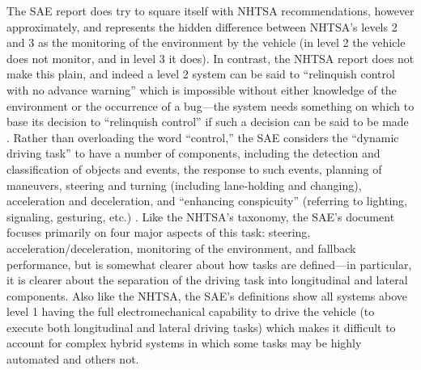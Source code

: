 The SAE report does try to square itself with NHTSA recommendations,
however approximately, and represents the hidden difference between
NHTSA's levels 2 and 3 as the monitoring of the environment by the
vehicle (in level 2 the vehicle does not monitor, and in level 3 it
does). In contrast, the NHTSA report does not make this plain, and
indeed a level 2 system can be said to ``relinquish control with no
advance warning'' which is impossible without either knowledge of the
environment or the occurrence of a bug---the system needs something on
which to base its decision to ``relinquish control'' if such a decision
can be said to be made \cite[p. 5]{NHTSA}. Rather than overloading the word ``control,''
the SAE considers the ``dynamic driving task'' to have a number of
components, including the detection and classification of objects and
events, the response to such events, planning of maneuvers, steering
and turning (including lane-holding and changing), acceleration and
deceleration, and ``enhancing conspicuity'' (referring to lighting,
signaling, gesturing, etc.) \cite[p. 6]{SAE}. Like the NHTSA's taxonomy, the SAE's
document focuses primarily on four major aspects of this task:
steering, acceleration/deceleration, monitoring of the environment,
and fallback performance, but is somewhat clearer about how tasks are
defined---in particular, it is clearer about the separation of the
driving task into longitudinal and lateral components. Also like the
NHTSA, the SAE's definitions show all systems above level 1 having the
full electromechanical capability to drive the vehicle (to execute
both longitudinal and lateral driving tasks) which makes it difficult
to account for complex hybrid systems in which some tasks may be
highly automated and others not.

